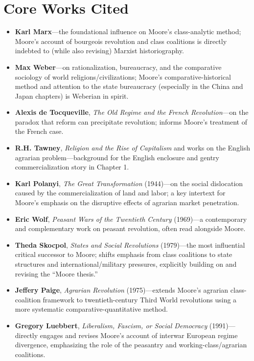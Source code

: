 \documentclass[12pt]{article}
\begin{document}
\section{Core Works Cited}

\begin{itemize}[leftmargin=*, itemsep=4pt]
    \item \textbf{Karl Marx}---the foundational influence on Moore's class-analytic method; Moore's account of bourgeois revolution and class coalitions is directly indebted to (while also revising) Marxist historiography.
    \item \textbf{Max Weber}---on rationalization, bureaucracy, and the comparative sociology of world religions/civilizations; Moore's comparative-historical method and attention to the state bureaucracy (especially in the China and Japan chapters) is Weberian in spirit.
    \item \textbf{Alexis de Tocqueville}, \textit{The Old Regime and the French Revolution}---on the paradox that reform can precipitate revolution; informs Moore's treatment of the French case.
    \item \textbf{R.H. Tawney}, \textit{Religion and the Rise of Capitalism} and works on the English agrarian problem---background for the English enclosure and gentry commercialization story in Chapter 1.
    \item \textbf{Karl Polanyi}, \textit{The Great Transformation} (1944)---on the social dislocation caused by the commercialization of land and labor; a key intertext for Moore's emphasis on the disruptive effects of agrarian market penetration.
    \item \textbf{Eric Wolf}, \textit{Peasant Wars of the Twentieth Century} (1969)---a contemporary and complementary work on peasant revolution, often read alongside Moore.
    \item \textbf{Theda Skocpol}, \textit{States and Social Revolutions} (1979)---the most influential critical successor to Moore; shifts emphasis from class coalitions to state structures and international/military pressures, explicitly building on and revising the ``Moore thesis.''
    \item \textbf{Jeffery Paige}, \textit{Agrarian Revolution} (1975)---extends Moore's agrarian class-coalition framework to twentieth-century Third World revolutions using a more systematic comparative-quantitative method.
    \item \textbf{Gregory Luebbert}, \textit{Liberalism, Fascism, or Social Democracy} (1991)---directly engages and revises Moore's account of interwar European regime divergence, emphasizing the role of the peasantry and working-class/agrarian coalitions.

\end{itemize}
\end{document}
